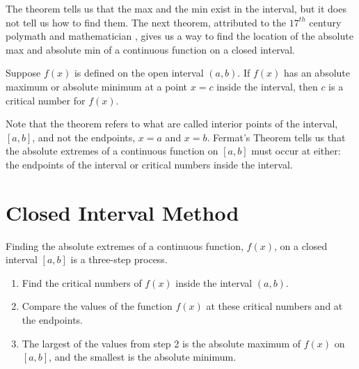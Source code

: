 \documentclass[handout]{ximera}
\begin{document}
The theorem tells us that the max and the min exist in the interval, 
but it does not tell us how to find them.
The next theorem, attributed to the $17^{th}$ century polymath and 
mathematician ,
gives us a way to find the location of the absolute max and absolute min of a continuous function on a closed interval.



\begin{theorem}
Suppose $f(x)$ is defined on the open interval $(a,b)$. If $f(x)$ has an absolute maximum or absolute minimum at 
a point $x = c$ inside the interval, then $c$ is a critical number for $f(x)$.
\end{theorem}
Note that the theorem refers to what are called interior points of the 
interval, $[a,b]$, and not the endpoints, $x = a$ and $x = b$.
Fermat's Theorem tells us that the absolute extremes of
a continuous function on $[a,b]$ must occur at either: the endpoints of the interval or critical numbers 
inside the interval.\\

\section{Closed Interval Method}
Finding the absolute extremes of a
continuous function, $f(x)$, on a closed interval $[a,b]$ is a three-step process.
\begin{enumerate}
\item[1.] Find the critical numbers of $f(x)$ inside the interval $(a, b)$.
\item[2.] Compare the values of the function $f(x)$ at these critical numbers and at the endpoints.
\item[3.] The largest of the values from step 2 is the absolute 
maximum of $f(x)$ on $[a,b]$, and the smallest is the absolute minimum.
\end{enumerate}
\end{document}

